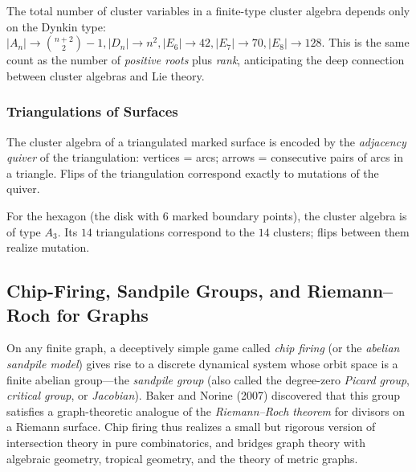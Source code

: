 \begin{remark}
The total number of cluster variables in a finite-type cluster algebra
depends only on the Dynkin type:
$|A_n| \to \binom{n + 2}{2} - 1, |D_n| \to n^2, |E_6| \to 42, |E_7| \to 70, |E_8| \to 128$.
This is the same count as the number of \emph{positive roots} plus
\emph{rank}, anticipating the deep connection between cluster algebras
and Lie theory.
\end{remark}

\subsubsection{Triangulations of Surfaces}

\begin{theorem}\label{thm:fst}
The cluster algebra of a triangulated marked surface is encoded by
the \emph{adjacency quiver} of the triangulation: vertices = arcs;
arrows = consecutive pairs of arcs in a triangle. Flips of the
triangulation correspond exactly to mutations of the quiver.
\end{theorem}

\begin{example}
For the hexagon (the disk with $6$ marked boundary points), the
cluster algebra is of type $A_3$. Its $14$ triangulations correspond
to the $14$ clusters; flips between them realize mutation.
\end{example}

\subsection{Chip-Firing, Sandpile Groups, and Riemann--Roch for Graphs}\label{subsec:chip-firing}

On any finite graph, a deceptively simple game called \emph{chip
firing} (or the \emph{abelian sandpile model}) gives rise to a
discrete dynamical system whose orbit space is a finite abelian
group---the \emph{sandpile group} (also called the degree-zero \emph{Picard
group}, \emph{critical group}, or \emph{Jacobian}). Baker and
Norine (2007) discovered that this group satisfies a graph-theoretic
analogue of the \emph{Riemann--Roch theorem} for divisors on a
Riemann surface. Chip firing thus realizes a small but rigorous
version of intersection theory in pure combinatorics, and bridges
graph theory with algebraic geometry, tropical geometry, and the
theory of metric graphs.

